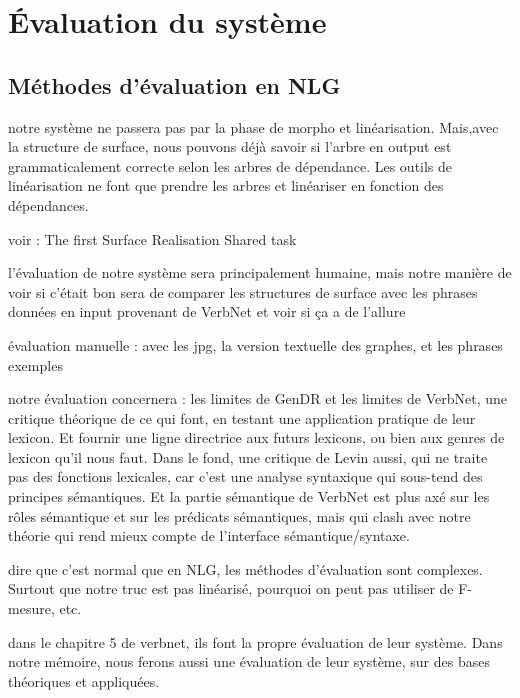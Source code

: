 \chapter{Évaluation du système}


\section{Méthodes d'évaluation en NLG}

notre système ne passera pas par la phase de morpho et linéarisation. Mais,avec la structure de surface, nous pouvons déjà savoir si l'arbre en output est grammaticalement correcte selon les arbres de dépendance. Les outils de linéarisation ne font que prendre les arbres et linéariser en fonction des dépendances. 

voir : The first Surface Realisation Shared task

l'évaluation de notre système sera principalement humaine, mais notre manière de voir si c'était bon sera de comparer les structures de surface avec les phrases données en input provenant de VerbNet et voir si ça a de l'allure

évaluation manuelle : avec les jpg, la version textuelle des graphes, et les phrases exemples

notre évaluation concernera : les limites de GenDR et les limites de VerbNet, une critique théorique de ce qui font, en testant une application pratique de leur lexicon. Et fournir une ligne directrice aux futurs lexicons, ou bien aux genres de lexicon qu'il nous faut. Dans le fond, une critique de Levin aussi, qui ne traite pas des fonctions lexicales, car c'est une analyse syntaxique qui sous-tend des principes sémantiques. Et la partie sémantique de VerbNet est plus axé sur les rôles sémantique et sur les prédicats sémantiques, mais qui clash avec notre théorie qui rend mieux compte de l'interface sémantique/syntaxe.

dire que c'est normal que en NLG, les méthodes d'évaluation sont complexes. Surtout que notre truc est pas linéarisé, pourquoi on peut pas utiliser de F-mesure, etc.

dans le chapitre 5 de verbnet, ils font la propre évaluation de leur système. Dans notre mémoire, nous ferons aussi une évaluation de leur système, sur des bases théoriques et appliquées.